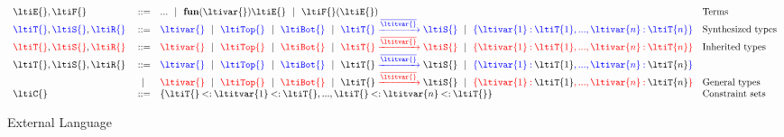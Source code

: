 \documentclass[9pt]{extarticle}
\begin{document}
\begin{figure}
$$
\begin{array}{lrll}
  \ltiE{}, \ltiF{} &::=& ... \alt
                         \ltiufun{\ltivar{}}{\ltiE{}} \alt
                         \ltiapp{\ltiF{}}{\ltiE{}}
                      &\mbox{Terms} \\
  \ltiSyn{\ltiT{}}, \ltiSyn{\ltiS{}}, \ltiSyn{\ltiR{}} &::=& 
                         \ltiSyn{\ltivar{}} \alt
                         \ltiSyn{\ltiTop{}} \alt
                         \ltiSyn{\ltiBot{}} \alt
                         \ltiSyn{\ltiArrow{\ltiT{}}{\overline{\ltitvar{}}}{\ltiS{}}} \alt
                         \ltiSyn{\ltiRec{\hastype{\ltivar{1}}{\ltiT{1}}, ..., \hastype{\ltivar{n}}{\ltiT{n}}}}
                      &\mbox{Synthesized types} \\
  \ltiChk{\ltiT{}}, \ltiChk{\ltiS{}}, \ltiChk{\ltiR{}} &::=& 
                         \ltiChk{\ltivar{}} \alt
                         \ltiChk{\ltiTop{}} \alt
                         \ltiChk{\ltiBot{}} \alt
                         \ltiChk{\ltiArrow{\ltiT{}}{\overline{\ltitvar{}}}{\ltiS{}}} \alt
                         \ltiChk{\ltiRec{\hastype{\ltivar{1}}{\ltiT{1}}, ..., \hastype{\ltivar{n}}{\ltiT{n}}}}
                      &\mbox{Inherited types} \\
  \ltiT{}, \ltiS{}, \ltiR{} &::=& 
                         \ltiSyn{\ltivar{}} \alt
                         \ltiSyn{\ltiTop{}} \alt
                         \ltiSyn{\ltiBot{}} \alt
                         \ltiSyn{\ltiArrow{\ltiSynChk{\ltiT{}}}{\overline{\ltitvar{}}}{\ltiSynChk{\ltiS{}}}} \alt
                         \ltiSyn{\ltiRec{\hastype{\ltivar{1}}{\ltiSynChk{\ltiT{1}}},
                                    ..., \hastype{\ltivar{n}}{\ltiSynChk{\ltiT{n}}}}}
                                    \\&\alt&
                         \ltiChk{\ltivar{}} \alt
                         \ltiChk{\ltiTop{}} \alt
                         \ltiChk{\ltiBot{}} \alt
                         \ltiChk{\ltiArrow{\ltiSynChk{\ltiT{}}}{\overline{\ltitvar{}}}{\ltiSynChk{\ltiS{}}}}
                         \alt
                         \ltiChk{\ltiRec{\hastype{\ltivar{1}}{\ltiSynChk{\ltiT{1}}},
                                    ..., \hastype{\ltivar{n}}{\ltiSynChk{\ltiT{n}}}}}
                      &\mbox{General types} \\
  \ltiC{} &::=& {\ltiCSet{\ltiCEntry{\ltiT{}}{\ltitvar{1}}{\ltiT{}}, ...,
                          \ltiCEntry{\ltiT{}}{\ltitvar{n}}{\ltiT{}}}}
                      &\mbox{Constraint sets} \\
\end{array}
$$
\caption{External Language}
\end{figure}
\end{document}
